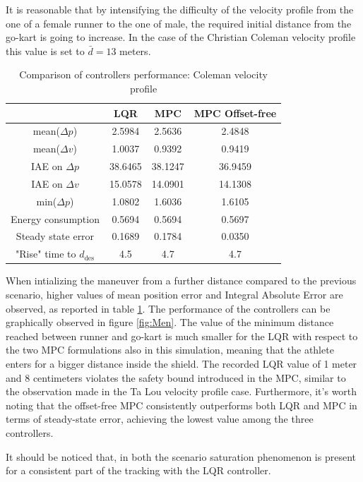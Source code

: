 \documentclass[a4paper,12pt,oneside]{book}
\begin{document}
It is reasonable that by intensifying the difficulty of the velocity profile from the one of a female runner to the one of male, the required initial distance from the go-kart is going to increase.
In the case of the Christian Coleman velocity profile this value is set to $\bar{d} = 13$ meters.

\begin{table}[h!]
	\centering
	\begin{tabular}{c|c|c|c}
          & \textbf{LQR} & \textbf{MPC} & \textbf{MPC Offset-free} \\
	\hline
	\hline
	mean($\Delta p$) & 2.5984 & 2.5636 &  2.4848 \\
	mean($\Delta v$) & 1.0037 & 0.9392 & 0.9419 \\
	IAE on $\Delta p$ & 38.6465 & 38.1247 & 36.9459 \\
	IAE on $\Delta v$ & 15.0578 & 14.0901 & 14.1308 \\
	min($\Delta p$) & 1.0802 & 1.6036 & 1.6105 \\
	Energy consumption & 0.5694 & 0.5694 & 0.5697 \\
	Steady state error & 0.1689 & 0.1784 & 0.0350 \\
	"Rise" time to $d_\text{des}$ & 4.5 & 4.7 & 4.7 \\
	\hline
	\end{tabular}
\caption{Comparison of controllers performance: Coleman velocity profile}
\label{tab:Coleman}
\end{table}

When intializing the maneuver from a further distance compared to the previous scenario, higher values of mean position error and Integral Absolute Error are observed, as reported in table \ref{tab:Coleman}.
The performance of the controllers can be graphically observed in figure \ref{fig:Men}.
The value of the minimum distance reached between runner and go-kart is much smaller for the LQR with respect to the two MPC formulations also in this simulation, meaning that the athlete enters for a bigger distance inside the shield.
The recorded LQR value of 1 meter and 8 centimeters violates the safety bound introduced in the MPC, similar to the observation made in the Ta Lou velocity profile case.
Furthermore, it's worth noting that the offset-free MPC consistently outperforms both LQR and MPC in terms of steady-state error, achieving the lowest value among the three controllers.

It should be noticed that, in both the scenario saturation phenomenon is present for a consistent part of the tracking with the LQR controller.
\end{document}
